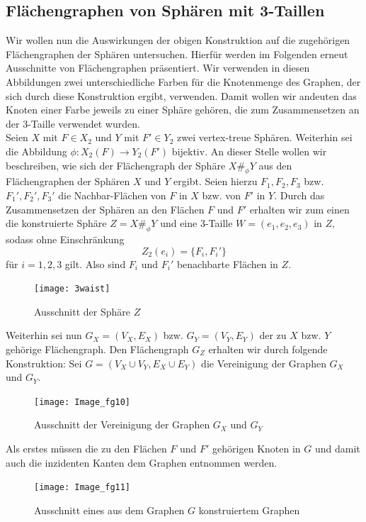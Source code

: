 \documentclass[12pt,titlepage,twoside,cleardoublepage]{article}
\theoremstyle{nummermitklammern}
\numberwithin{equation}{section}
\begin{document}
\subsection{Flächengraphen von Sphären mit 3-Taillen}
Wir wollen nun die Auswirkungen der obigen Konstruktion auf die zugehörigen Flächengraphen der Sphären untersuchen.
Hierfür werden im Folgenden erneut Ausschnitte von Flächengraphen präsentiert. Wir verwenden in diesen Abbildungen zwei unterschiedliche Farben für die Knotenmenge des Graphen, der sich durch diese Konstruktion ergibt, verwenden. Damit wollen wir andeuten das Knoten einer Farbe jeweils zu einer Sphäre gehören, die zum Zusammensetzen an der 3-Taille verwendet wurden.\\
Seien $X$ mit $F\in X_2$ und $Y$ mit $F'\in Y_2$ zwei vertex-treue Sphären. Weiterhin sei die Abbildung $\phi:X_2(F)\to Y_2(F')$ bijektiv. An dieser Stelle wollen wir beschreiben, wie sich der Flächengraph der Sphäre $X\#_{\phi}Y$ aus den Flächengraphen der Sphären $X$ und $Y$ ergibt. Seien hierzu $F_1,F_2,F_3$ bzw. $F_1',F_2',F_3'$ die Nachbar-Flächen von $F$ in $X$ bzw. von $F'$ in $Y.$ Durch das Zusammensetzen der Sphären an den Flächen $F$ und $F'$ erhalten wir zum einen die konstruierte Sphäre $Z=X \#_\phi Y$ und eine 3-Taille $W=(e_1,e_2,e_3)$ in $Z,$ sodass ohne Einschränkung 
\[
Z_2(e_i)=\{F_i,F_i'\}
\] für $i=1,2,3$ gilt. Also sind $F_i$ und $F_i'$ benachbarte Flächen in $Z$.
\begin{figure}[H]
\begin{center}
\texttt{[image: 3waist]}
\end{center}
\caption{Ausschnitt der Sphäre $Z$}
\end{figure}   
 Weiterhin sei nun $G_X=(V_X,E_X)$ bzw. $G_Y=(V_Y,E_Y)$ der zu $X$ bzw. $Y$ gehörige Flächengraph. Den Flächengraph $G_Z$ erhalten wir durch folgende Konstruktion:
Sei $G=(V_X\cup V_Y,E_X \cup E_Y)$ die Vereinigung der Graphen $G_X$ und $G_Y.$
\begin{figure}[H]
\begin{center}
\texttt{[image: Image\_fg10]}
\end{center}
\caption{Ausschnitt der Vereinigung der Graphen $G_X$ und $G_Y$}
\end{figure}
Als erstes müssen die zu den Flächen $F$ und $F'$ gehörigen Knoten in $G$ und damit auch die inzidenten Kanten dem Graphen entnommen werden. 
\begin{figure}[H]
\begin{center}
\texttt{[image: Image\_fg11]}
\end{center}
\caption{Ausschnitt eines aus dem Graphen $G$ konstruiertem Graphen}
\end{figure}
\end{document}
